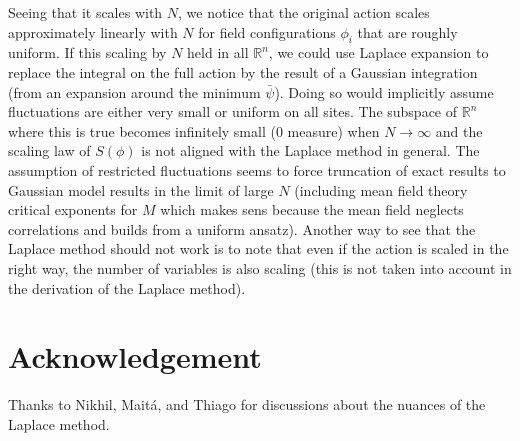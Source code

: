 \documentclass[10pt, a4paper]{article}
\begin{document}
{\begin{enumerate}
  Seeing that it scales with $N$, we notice that the original action scales approximately linearly with $N$ for field configurations $\phi_i$ that are roughly uniform. If this scaling by $N$ held in all $\mathbb{R}^n$, we could use Laplace expansion to replace the integral on the full action by the result of a Gaussian integration (from an expansion around the minimum $\bar{\psi}$). Doing so would implicitly assume fluctuations are either very small or uniform on all sites. The subspace of $\mathbb{R}^n$ where this is true becomes infinitely small ($0$ measure) when $N \to \infty$ and the scaling law of $S(\phi)$ is not aligned with the Laplace method in general. The assumption of restricted fluctuations seems to force truncation of exact results to Gaussian model results in the limit of large $N$ (including mean field theory critical exponents for $M$ which makes sens because the mean field neglects correlations and builds from a uniform ansatz). Another way to see that the Laplace method should not work is to note that even if the action is scaled in the right way, the number of variables is also scaling (this is not taken into account in the derivation of the Laplace method). 

\end{enumerate}

\section{Acknowledgement}

Thanks to Nikhil, Maitá, and Thiago for discussions about the nuances of the Laplace method. 

}

\makereferences


\end{document}
